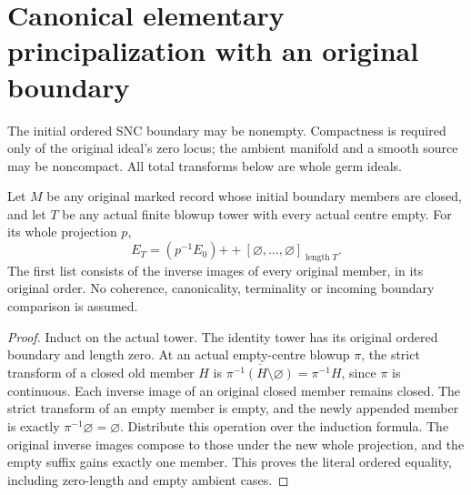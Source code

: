 \section{Canonical elementary principalization with an original boundary}

The initial ordered SNC boundary may be nonempty.  Compactness is required
only of the original ideal's zero locus; the ambient manifold and a smooth
source may be noncompact.  All total transforms below are whole germ ideals.

\begin{lemma}
\label{hir:original-all-empty-whole-boundary}
\leanok
Let $M$ be any original marked record whose initial boundary members are
closed, and let $T$ be any actual finite blowup tower with every actual
centre empty.  For its whole projection $p$,
\[
 E_T=(p^{-1}E_0)\mathbin{+\!+}
        [\varnothing,\ldots,\varnothing]_{\operatorname{length}T}.
\]
The first list consists of the inverse images of every original member,
in its original order.  No coherence, canonicality, terminality or
incoming boundary comparison is assumed.
\end{lemma}
\begin{proof}
Induct on the actual tower.  The identity tower has its original ordered
boundary and length zero.  At an actual empty-centre blowup $\pi$, the
strict transform of a closed old member $H$ is
$\overline{\pi^{-1}(H\setminus\varnothing)}=\pi^{-1}H$, since $\pi$ is
continuous.  Each inverse image of an original closed member remains
closed.  The strict transform of an empty member is empty, and the newly
appended member is exactly $\pi^{-1}\varnothing=\varnothing$.
Distribute this operation over the induction formula.  The original
inverse images compose to those under the new whole projection, and
the empty suffix gains exactly one member.  This proves the literal
ordered equality, including zero-length and empty ambient cases.
\end{proof}

